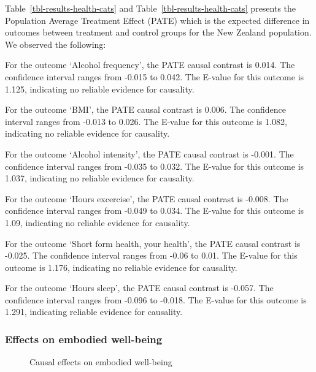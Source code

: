 \documentclass[
  singlecolumn,
  9pt]{article}
\begin{document}
\begin{table}
{\addtocounter{table}{-1}

}

\end{table}%

Table~\ref{tbl-results-health-cats} and
Table~\ref{tbl-results-health-cats} presents the Population Average
Treatment Effect (PATE) which is the expected difference in outcomes
between treatment and control groups for the New Zealand population. We
observed the following:

For the outcome `Alcohol frequency', the PATE causal contrast is 0.014.
The confidence interval ranges from -0.015 to 0.042. The E-value for
this outcome is 1.125, indicating no reliable evidence for causality.

For the outcome `BMI', the PATE causal contrast is 0.006. The confidence
interval ranges from -0.013 to 0.026. The E-value for this outcome is
1.082, indicating no reliable evidence for causality.

For the outcome `Alcohol intensity', the PATE causal contrast is -0.001.
The confidence interval ranges from -0.035 to 0.032. The E-value for
this outcome is 1.037, indicating no reliable evidence for causality.

For the outcome `Hours excercise', the PATE causal contrast is -0.008.
The confidence interval ranges from -0.049 to 0.034. The E-value for
this outcome is 1.09, indicating no reliable evidence for causality.

For the outcome `Short form health, your health', the PATE causal
contrast is -0.025. The confidence interval ranges from -0.06 to 0.01.
The E-value for this outcome is 1.176, indicating no reliable evidence
for causality.

For the outcome `Hours sleep', the PATE causal contrast is -0.057. The
confidence interval ranges from -0.096 to -0.018. The E-value for this
outcome is 1.291, indicating reliable evidence for causality.

\newpage{}

\subsubsection{Effects on embodied
well-being}\label{effects-on-embodied-well-being}

\begin{figure}


\caption{\label{fig-results-embodied-cats}Causal effects on embodied
well-being}

\end{figure}%
\end{document}
